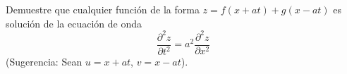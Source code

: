 \item Demuestre que cualquier función de la forma $z = f(x + at) + g(x - at)$ es solución de la ecuación de onda
\[ \frac{\partial^2 z}{\partial t^2} = a^2 \frac{\partial^2 z}{\partial x^2} \]
(Sugerencia: Sean $u = x + at$, $v = x - at$).
